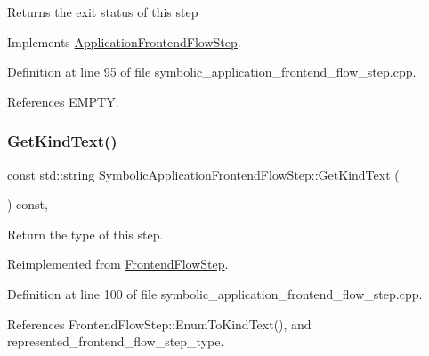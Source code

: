 \begin{DoxyReturn}{Returns}
the exit status of this step 
\end{DoxyReturn}


Implements \hyperlink{classApplicationFrontendFlowStep_a2bf060a5ebc1735635dc5c7773387a25}{Application\+Frontend\+Flow\+Step}.



Definition at line 95 of file symbolic\+\_\+application\+\_\+frontend\+\_\+flow\+\_\+step.\+cpp.



References E\+M\+P\+TY.

\mbox{\label{classSymbolicApplicationFrontendFlowStep_a3fdc0f543227c3393142eba328137704}} 
\subsubsection{\texorpdfstring{Get\+Kind\+Text()}{GetKindText()}}
{\footnotesize\ttfamily const std\+::string Symbolic\+Application\+Frontend\+Flow\+Step\+::\+Get\+Kind\+Text (\begin{DoxyParamCaption}{ }\end{DoxyParamCaption}) const\hspace{0.3cm}{\ttfamily [override]}, {\ttfamily [virtual]}}



Return the type of this step. 



Reimplemented from \hyperlink{classFrontendFlowStep_a264285918b0d8ea193eb1c2f3af17ef4}{Frontend\+Flow\+Step}.



Definition at line 100 of file symbolic\+\_\+application\+\_\+frontend\+\_\+flow\+\_\+step.\+cpp.



References Frontend\+Flow\+Step\+::\+Enum\+To\+Kind\+Text(), and represented\+\_\+frontend\+\_\+flow\+\_\+step\+\_\+type.

